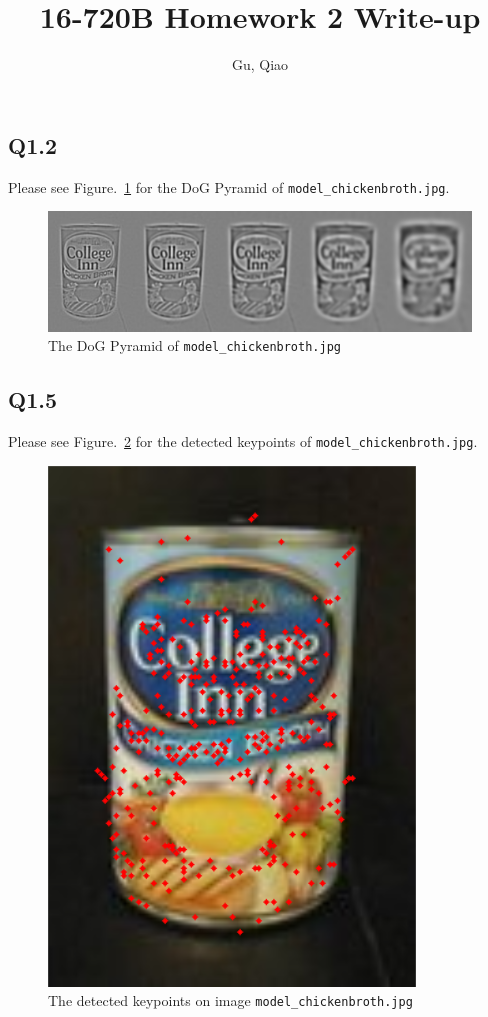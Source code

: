 \documentclass[11pt]{article}
\newcommand{\code}[1]{\texttt{#1}}
\begin{document}
\author{Gu, Qiao}
\title{16-720B Homework 2 Write-up}
\maketitle

\medskip

\subsection*{Q1.2}

Please see Figure.~\ref{fig:q1.2} for the DoG Pyramid of \code{model\_chickenbroth.jpg}.

\begin{figure}[h!]
    \centering
    \includegraphics[width=.8\linewidth]{../results/q1_2.png}
    \caption{The DoG Pyramid of \code{model\_chickenbroth.jpg}}
    \label{fig:q1.2}
\end{figure}

\newpage

\subsection*{Q1.5}

Please see Figure.~\ref{fig:q1.5} for the detected keypoints of \code{model\_chickenbroth.jpg}.

\begin{figure}[h!]
    \centering
    \includegraphics[width=.4\linewidth]{../results/q1_5.png}
    \caption{The detected keypoints on image \code{model\_chickenbroth.jpg}}
    \label{fig:q1.5}
\end{figure}
\end{document}
